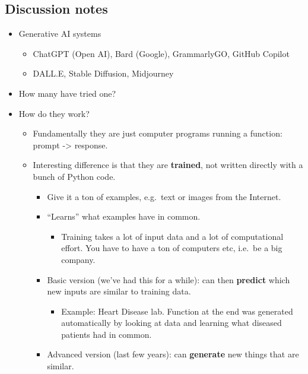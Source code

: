 \documentclass{article}
\begin{document}
\subsection*{Discussion notes}

\begin{itemize}
  \item Generative AI systems
\begin{itemize}
  \item
    ChatGPT (Open AI), Bard (Google), GrammarlyGO, GitHub Copilot
  \item
    DALL.E, Stable Diffusion, Midjourney
  \end{itemize}
\item
  How many have tried one?
\item
  How do they work?

  \begin{itemize}

  \item
    Fundamentally they are just computer programs running a function:
    prompt -\textgreater{} response.
  \item
    Interesting difference is that they are \textbf{trained}, not
    written directly with a bunch of Python code.

    \begin{itemize}

    \item
      Give it a ton of examples, e.g.~text or images from the Internet.
    \item
      ``Learns'' what examples have in common.

      \begin{itemize}

      \item
        Training takes a lot of input data and a lot of computational
        effort. You have to have a ton of computers etc, i.e.~be a big
        company.
      \end{itemize}
    \item
      Basic version (we've had this for a while): can then
      \textbf{predict} which new inputs are similar to training data.

      \begin{itemize}

      \item
        Example: Heart Disease lab. Function at the end was generated
        automatically by looking at data and learning what diseased
        patients had in common.
      \end{itemize}
    \item
      Advanced version (last few years): can \textbf{generate} new
      things that are similar.


\end{itemize}
\end{itemize}
\end{itemize}
\end{document}

